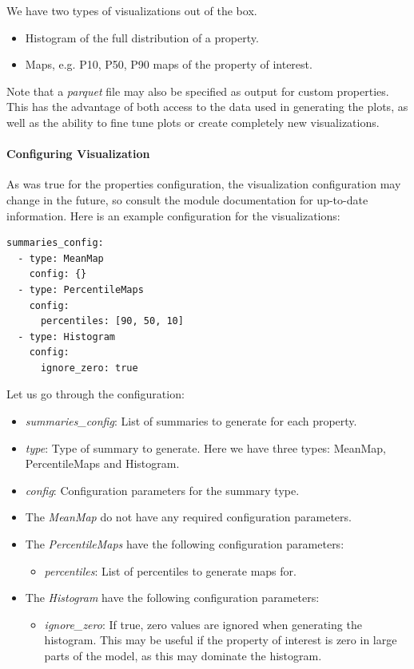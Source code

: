 \documentclass[note,screen,english,12pt,utf8]{nrdoc}
\begin{document}
We have two types of visualizations out of the box.

\begin{itemize}
    \item Histogram of the full distribution of a property.
    \item Maps, e.g. P10, P50, P90 maps of the property of interest.
\end{itemize}

Note that a \emph{parquet} file may also be specified as output for
custom properties. This has the advantage of both access to the
data used in generating the plots, as well as the ability to
fine tune plots or create completely new visualizations.

\paragraph{Configuring Visualization}

As was true for the properties configuration, the visualization configuration may
change in the future, so consult the module documentation for up-to-date
information.  Here is an example configuration for the visualizations:
\begin{verbatim}
summaries_config:
  - type: MeanMap
    config: {}
  - type: PercentileMaps
    config:
      percentiles: [90, 50, 10]
  - type: Histogram
    config:
      ignore_zero: true
\end{verbatim}


Let us go through the configuration:
\begin{itemize}
    \item{
        \emph{summaries\_config}: List of summaries to generate for each property.
    }
    \item{
        \emph{type}: Type of summary to generate. Here we have three types:
        MeanMap, PercentileMaps and Histogram.
    }
    \item{
        \emph{config}: Configuration parameters for the summary type.
    }
    \item{
        The \emph{MeanMap} do not have any required configuration parameters.
    }
    \item{
        The \emph{PercentileMaps} have the following configuration parameters:
        \begin{itemize}
            \item \emph{percentiles}: List of percentiles to generate maps for.
        \end{itemize}
    }
    \item{
        The \emph{Histogram} have the following configuration parameters:
        \begin{itemize}
            \item \emph{ignore\_zero}: If true, zero values are ignored when generating the histogram.
              This may be useful if the property of interest is zero in large parts of the model,
              as this may dominate the histogram.
        \end{itemize}
    }
\end{itemize}
\end{document}

